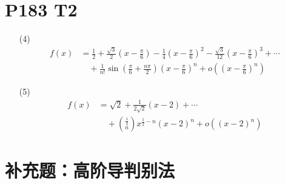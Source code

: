 \documentclass{article}
\begin{document}
\section*{P183 T2}

\begin{itemize}
    \item [(4)]
    \begin{align*}
        f(x) & = \frac{1}{2} + \frac{\sqrt{3}}{2}\left(x - \frac{\pi}{6}\right) - \frac{1}{4}\left(x - \frac{\pi}{6}\right)^2 - \frac{\sqrt{3}}{12}\left(x - \frac{\pi}{6}\right)^3 + \cdots \\
        & \quad + \frac{1}{n!}\sin \left(\frac{\pi}{6} + \frac{n\pi}{2}\right)\left(x - \frac{\pi}{6}\right)^n + o\left(\left(x - \frac{\pi}{6}\right)^n\right)
    \end{align*}
    \item [(5)]
    \begin{align*}
        f(x) & = \sqrt{2} + \frac{1}{2\sqrt{2}}\left(x - 2\right) + \cdots \\
        & \quad + \binom{\frac{1}{2}}{n}x^{\frac{1}{2} - n}\left(x - 2\right)^n + o\left(\left(x - 2\right)^n\right)
    \end{align*}
\end{itemize}

\section*{补充题：高阶导判别法}
\end{document}
